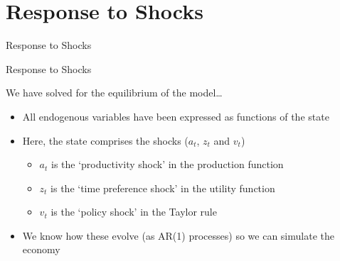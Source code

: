 \documentclass{beamer}
\begin{document}
\section{Response to Shocks}

\begin{frame}

\begin{center}
{\LARGE Response to Shocks}
\end{center}

\end{frame}


	
\begin{frame}{Response to Shocks}

We have solved for the equilibrium of the model\ldots
\begin{itemize}
\item	All endogenous variables have been expressed as functions of the state
\item	Here, the state comprises the shocks ($a_{t}$, $z_{t}$ and $v_{t}$)
	\begin{itemize}
	\item	$a_{t}$ is the `productivity shock' in the production function
	\item	$z_{t}$ is the `time preference shock' in the utility function
	\item	$v_{t}$ is the `policy shock' in the Taylor rule
	\end{itemize}
\item	We know how these evolve (as AR(1) processes) so we can simulate the economy
\end{itemize}

\end{frame}
\end{document}
